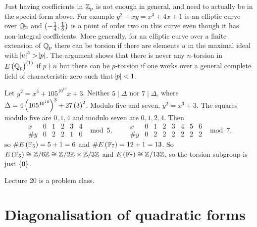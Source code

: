 \begin{remark}
Just having coefficients in $ \mathbb{Z}_p $ is not enough in general, and need to actually be in the special form above. For example $ y^2 + xy = x^3 + 4x + 1 $ is an elliptic curve over $ \mathbb{Q}_2 $ and $ \br{-\tfrac{1}{4}, \tfrac{1}{8}} $ is a point of order two on this curve even though it has non-integral coefficients. More generally, for an elliptic curve over a finite extension of $ \mathbb{Q}_p $ there can be torsion if there are elements $ u $ in the maximal ideal with $ \abs{u}^5 > \abs{p} $. The argument shows that there is never any $ n $-torsion in $ E\br{\QQ_p}^{\br{1}} $ if $ p \nmid n $ but there can be $ p $-torsion if one works over a general complete field of characteristic zero such that $ \abs{p} < 1 $.
\end{remark}

\begin{example}
Let $ y^2 = x^3 + 105^{10^{10}}x + 3 $. Neither $ 5 \mid \Delta $ nor $ 7 \mid \Delta $, where $ \Delta = 4\br{105^{10^{10}}}^3 + 27\br{3}^2 $. Modulo five and seven, $ y^2 = x^3 + 3 $. The squares modulo five are $ 0, 1, 4 $ and modulo seven are $ 0, 1, 2, 4 $. Then
$$
\begin{array}{c|c|c|c|c|c}
x & 0 & 1 & 2 & 3 & 4 \\
\hline
\#y & 0 & 2 & 2 & 1 & 0
\end{array}
\mod 5, \qquad
\begin{array}{c|c|c|c|c|c|c|c}
x & 0 & 1 & 2 & 3 & 4 & 5 & 6 \\
\hline
\#y & 0 & 2 & 2 & 2 & 2 & 2 & 2
\end{array}
\mod 7,
$$
so $ \#E\br{\FF_5} = 5 + 1 = 6 $ and $ \#E\br{\FF_7} = 12 + 1 = 13 $. So $ E\br{\FF_5} \cong \ZZ / 6\ZZ \cong \ZZ / 2\ZZ \times \ZZ / 3\ZZ $ and $ E\br{\FF_7} \cong \ZZ / 13\ZZ $, so the torsion subgroup is just $ \cbr{0} $.
\end{example}


Lecture 20 is a problem class.

\pagebreak

\appendix

\section{Diagonalisation of quadratic forms}

